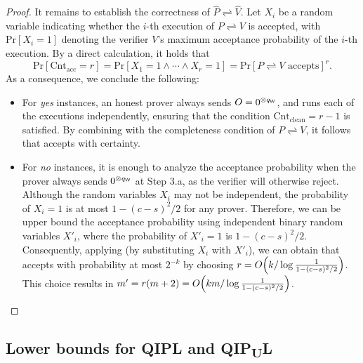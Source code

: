 \documentclass[10pt,a4paper]{article}
\numberwithin{equation}{section}
\numberwithin{figure}{section}
\newcommand{\QIPL}{\textnormal{\textsf{QIPL}}\xspace}
\newcommand{\QIPUL}{\texorpdfstring{\textnormal{\textsf{QIP}\textsubscript{\textnormal{U}}\textsf{L}}}\xspace}
\newcommand{\protocol}[2]{{#1}\!\rightleftharpoons\!{#2}}
\DeclarePairedDelimiter\rbra{\lparen}{\rparen}
\let\ket\relax\DeclarePairedDelimiter\ket{\lvert}{\rangle}
\newcommand{\Cnt}{\mathrm{Cnt}}
\newcommand{\clean}{\mathrm{clean}}
\newcommand{\acc}{\mathrm{acc}}
\renewcommand{\Pr}[1]{\mathrm{Pr}\left[#1\right]}
\newcommand{\sfW}{\mathsf{W}}
\newcommand{\hatP}{\widehat{P}}
\newcommand{\hatV}{\widehat{V}}
\begin{document}
\begin{proof}
    \vspace{1em}
    It remains to establish the correctness of $\protocol{\hatP}{\hatV}$. Let $X_i$ be a random variable indicating whether the $i$-th execution of $\protocol{P}{V}$ is accepted, with $\Pr{X_i = 1}$ denoting the verifier $V$'s maximum acceptance probability of the $i$-th execution.  
    By a direct calculation, it holds that
    \begin{equation}
        \label{eq:QIPL-error-reduction-AND}
        \Pr{\Cnt_{\acc} = r} = \Pr{ X_1=1 \wedge \cdots \wedge X_r = 1 } = 
        \Pr{\protocol{P}{V}\text{ accepts}}^r.
    \end{equation}
    As a consequence, we conclude the following: 
    \begin{itemize}[leftmargin=2em]
        \item For \textit{yes} instances, an honest prover always sends $\ket{O} = \ket{0}^{\otimes q_{\sfW}}$, 
        and runs each of the executions independently, ensuring that the condition $\Cnt_{\clean} = r-1$ is satisfied. By combining  with the completeness condition of $\protocol{P}{V}$, it follows that  accepts with certainty. 
        \item For \textit{no} instances, it is enough to analyze the acceptance probability when the prover always sends $\ket{0}^{\otimes q_{\sfW}}$ at Step 3.a, as the verifier will otherwise reject. 
        Although the random variables $X_i$ may not be independent, 
        the probability of $X_i=1$ is at most $1 - (c-s)^2/2$ for any prover. Therefore, we can be upper bound the acceptance probability using independent binary random variables $X'_i$, where the probability of $X'_i=1$ is $1 - (c-s)^2/2$. 
        Consequently, applying  (by substituting $X_i$ with $X'_i$), we can obtain that  accepts with probability at most $2^{-k}$ by choosing $r = O\rbra*{k/\log\frac{1}{1-(c-s)^2/2}}$. This choice results in $m' = r(m+2) = O\rbra*{km/\log\frac{1}{1-(c-s)^2/2}}$. \qedhere
    \end{itemize}
\end{proof}

\subsection{Lower bounds for \QIPL{} and \QIPUL{}}
\label{subsec:lower-bounds-QIPL}
\end{document}
